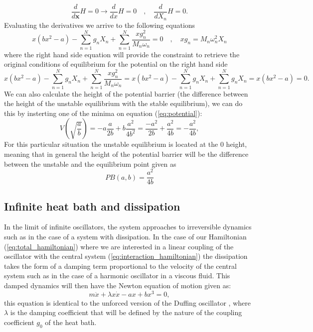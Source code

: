 \begin{equation}
\frac{d}{d\textbf{x}}H=0\rightarrow \frac{d}{dx}H =0 \quad , \quad \frac{d}{dX_n}H  = 0.
\end{equation}
Evaluating the derivatives we arrive to the following equations
\begin{equation}
x(bx^2-a)-\sum_{n=1}^N g_n X_n +\sum_{n=1}^N \frac{xg_n^2}{M_n\omega_n}=0 \quad , \quad xg_n=M_n\omega_n^2 X_n 
\end{equation}
where the right hand side equation will provide the constraint to retrieve the original conditions of equilibrium for the potential on the right hand side
\begin{equation}
x(bx^2-a)-\sum_{n=1}^N g_n X_n +\sum_{n=1}^N \frac{xg_n^2}{M_n\omega_n}= x(bx^2-a)-\sum_{n=1}^N g_n X_n +\sum_{n=1}^N g_n X_n=x(bx^2-a)=0.
\end{equation}
We can also calculate the height of the potential barrier (the difference between the height of the unstable equilibrium with the stable equilibrium), we can do this by insterting one of the minima on equation (\ref{eq:potential}):
\begin{equation}
V(\sqrt{\frac{a}{b}})=-a\frac{a}{2b}+b\frac{a^2}{4b^2}=\frac{-a^2}{2b}+\frac{a^2}{4b}=-\frac{a^2}{4b},
\end{equation}
For this particular situation the unstable equilibrium is located at the $0$ height, meaning that in general the height of the potential barrier will be the difference between the unstable and the equilibrium point given as
\begin{equation}
PB(a,b)=\frac{a^2}{4b}
\label{eq:PB_eq}
\end{equation}



\subsection{Infinite heat bath and dissipation}
In the limit of infinite oscillators, the system approaches to irreversible dynamics such as in the case of a system with dissipation. In the case of our Hamiltonian (\ref{eq:total_hamiltonian}) where we are interested in a linear coupling of the oscillator with the central system (\ref{eq:interaction_hamiltonian}) the dissipation takes the form of a damping term proportional to the velocity of the central system such as in the case of a harmonic oscillator in a viscous fluid. This damped dynamics will then have the Newton equation of motion given as:
\begin{equation}
m\ddot{x}+\lambda x\dot{x}-ax+bx^3=0,
\label{eq:newton_damped}
\end{equation}
this equation is identical to the unforced version of the Duffing oscillator \cite{guckenheimer2013nonlinear}, where $\lambda$  is the damping coefficient that will be defined by the nature of the coupling coefficient $g_0$ of the heat bath.

